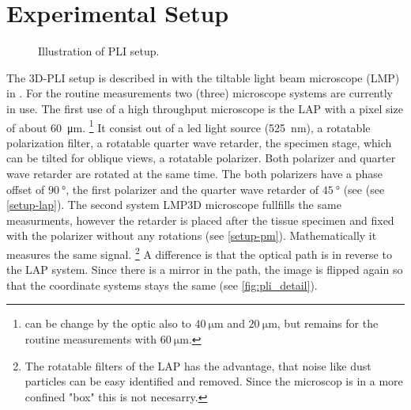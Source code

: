 \section{Experimental Setup}\label{sec:expSetup}
%
\begin{figure}[!t]
    \captionsetup[sub]{position=top}
    \setlength{\tikzwidth}{\textwidth}
	\centering
	\caption{Illustration of PLI setup.}
	\label{fig:pli_setup}
\end{figure}
%
%
The \ac{3D-PLI} setup is described in \cite{Axer2011} with the tiltable light beam microscope (LMP) in \cite{Wiese:887678}.
For the routine measurements two (three) microscope systems are currently in use.
The first use of a high throughput microscope is the \ac{LAP} with a pixel size of about \SI{60}{\micro\meter}. \footnote{can be change by the optic also to $\SI{40}{\micro\meter}$ and $\SI{20}{\micro\meter}$, but remains for the routine measurements with $\SI{60}{\micro\meter}$.}
It consist out of a led light source (\SI{525}{\nano\meter}), a rotatable polarization filter, a rotatable quarter wave retarder, the specimen stage, which can be tilted for oblique views, a rotatable polarizer.
Both polarizer and quarter wave retarder are rotated at the same time.
The both polarizers have a phase offset of $\SI{90}{\degree}$, the first polarizer and the quarter wave retarder of $\SI{45}{\degree}$ (see (see \cref{setup-lap}).
The second system \ac{LMP3D} microscope fullfills the same measurments, however the retarder is placed after the tissue specimen and fixed with the polarizer without any rotations (see \cref{setup-pm}).
Mathematically it measures the same signal.
\footnote{The rotatable filters of the \ac{LAP} has the advantage, that noise like dust particles can be easy identified and removed. Since the microscop is in a more confined "box" this is not necesarry.}
A difference is that the optical path is in reverse to the \ac{LAP} system.
Since there is a mirror in the path, the image is flipped again so that the coordinate systems stays the same (see \cref{fig:pli_detail}).
% 
